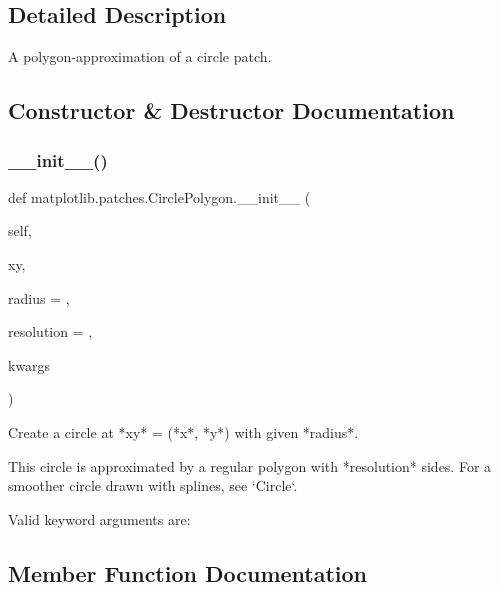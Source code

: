 \subsection{Detailed Description}
\begin{DoxyVerb}A polygon-approximation of a circle patch.\end{DoxyVerb}
 

\subsection{Constructor \& Destructor Documentation}
\mbox{\label{classmatplotlib_1_1patches_1_1CirclePolygon_a399b335c9f107df89b35136c41ae9189}} 
\subsubsection{\texorpdfstring{\+\_\+\+\_\+init\+\_\+\+\_\+()}{\_\_init\_\_()}}
{\footnotesize\ttfamily def matplotlib.\+patches.\+Circle\+Polygon.\+\_\+\+\_\+init\+\_\+\+\_\+ (\begin{DoxyParamCaption}\item[{}]{self,  }\item[{}]{xy,  }\item[{}]{radius = {},  }\item[{}]{resolution = {},  }\item[{}]{kwargs }\end{DoxyParamCaption})}

\begin{DoxyVerb}Create a circle at *xy* = (*x*, *y*) with given *radius*.

This circle is approximated by a regular polygon with *resolution*
sides.  For a smoother circle drawn with splines, see `Circle`.

Valid keyword arguments are:

\end{DoxyVerb}
 

\subsection{Member Function Documentation}
\mbox{\label{classmatplotlib_1_1patches_1_1CirclePolygon_a027ee5ae8287e8b779413286229caf3c}} 
